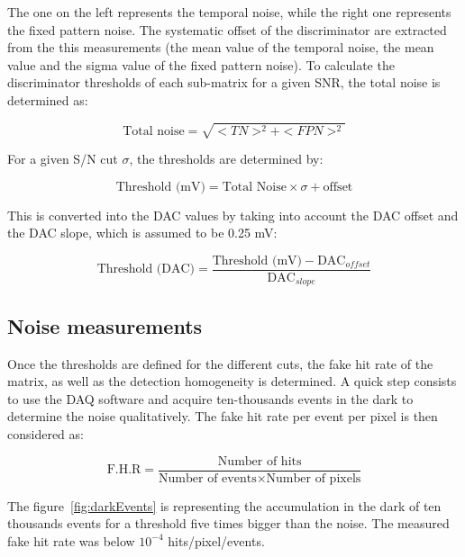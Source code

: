  The one on the left represents the temporal noise, while the right one represents the fixed pattern noise.
  The systematic offset of the discriminator are extracted from the this measurements (the mean value of the temporal noise, the mean value and the sigma value of the fixed pattern noise).
  To calculate the discriminator thresholds of each sub-matrix for a given \gls{SNR}, the total noise is determined as:
  
  \begin{equation}
    \text{Total noise} = \sqrt{<TN>^2 + <FPN>^2}
  \end{equation}

  For a given S/N cut $\sigma$, the thresholds are determined by:

  \begin{equation}
    \text{Threshold (mV)} = \text{Total Noise} \times \sigma + \text{offset}
  \end{equation}

  This is converted into the DAC values by taking into account the DAC offset and the DAC slope, which is assumed to be 0.25 mV:
  
  \begin{equation}
    \text{Threshold (DAC)} = \frac{\text{Threshold (mV)} - \text{DAC}_{offset}}{\text{DAC}_{slope}}
  \end{equation}



  \subsection{Noise measurements}

  Once the thresholds are defined for the different cuts, the fake hit rate of the matrix, as well as the detection homogeneity is determined.
  A quick step consists to use the DAQ software and acquire ten-thousands events in the dark to determine the noise qualitatively. 
  The fake hit rate per event per pixel is then considered as:

  \begin{equation}
    \text{F.H.R} = \frac{\text{Number of hits}}{\text{Number of events} \times \text{Number of pixels}} 
  \end{equation}
  
  The figure~\ref{fig:darkEvents} is representing the accumulation in the dark of ten thousands events for a threshold five times bigger than the noise.
  The measured fake hit rate was below $10^{-4}$ hits/pixel/events.

